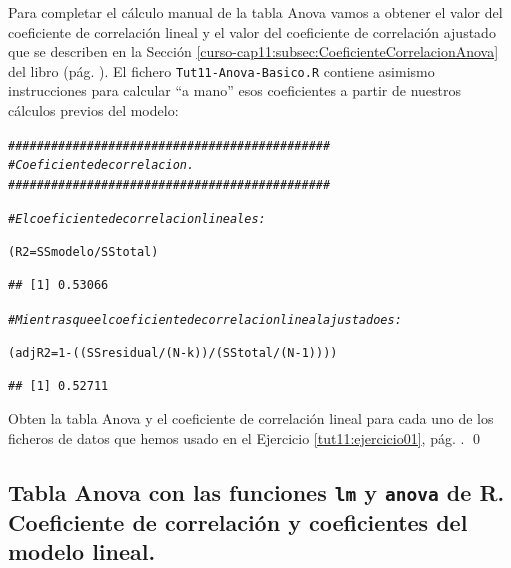 \documentclass[10pt,a4paper]{article}\usepackage[]{graphicx}\usepackage[]{color}
\makeatletter
\newcommand{\hlnum}[1]{\textcolor[rgb]{0.686,0.059,0.569}{#1}}%
\newcommand{\hlcom}[1]{\textcolor[rgb]{0.678,0.584,0.686}{\textit{#1}}}%
\newcommand{\hlopt}[1]{\textcolor[rgb]{0,0,0}{#1}}%
\newcommand{\hlstd}[1]{\textcolor[rgb]{0.345,0.345,0.345}{#1}}%
\newcommand{\hlkwb}[1]{\textcolor[rgb]{0.69,0.353,0.396}{#1}}%
\newenvironment{kframe}{%
 \def\at@end@of@kframe{}%
 \ifinner\ifhmode%
  \def\at@end@of@kframe{\end{minipage}}%
  \begin{minipage}{\columnwidth}%
 \fi\fi%
 \def\FrameCommand##1{\hskip\@totalleftmargin \hskip-\fboxsep
 \colorbox{shadecolor}{##1}\hskip-\fboxsep
     \hskip-\linewidth \hskip-\@totalleftmargin \hskip\columnwidth}%
 \MakeFramed {\advance\hsize-\width
   \@totalleftmargin\z@ \linewidth\hsize
   \@setminipage}}%
 {\par\unskip\endMakeFramed%
 \at@end@of@kframe}
\newenvironment{knitrout}{}{} %
\newcounter {cont01}
\makeatother
\begin{document}
Para completar el cálculo manual de la tabla Anova vamos a obtener el valor del coeficiente de correlación lineal y el valor del coeficiente de correlación ajustado que se describen en la Sección \ref{curso-cap11:subsec:CoeficienteCorrelacionAnova} del libro (pág. \pageref{curso-cap11:subsec:CoeficienteCorrelacionAnova}). El fichero {\tt Tut11-Anova-Basico.R} contiene asimismo instrucciones para calcular ``a mano'' esos coeficientes a partir de nuestros cálculos previos del modelo:
\begin{knitrout}
\color{fgcolor}\begin{kframe}
\begin{alltt}
\hlcom{#############################################}
\hlcom{# Coeficiente de correlacion.}
\hlcom{#############################################}

\hlcom{# El coeficiente de correlacion lineal es:}

\hlstd{(R2} \hlkwb{=} \hlstd{SSmodelo} \hlopt{/} \hlstd{SStotal)}
\end{alltt}
\begin{verbatim}
## [1] 0.53066
\end{verbatim}
\begin{alltt}
\hlcom{# Mientras que el coeficiente de correlacion lineal ajustado es:}

\hlstd{(adjR2} \hlkwb{=} \hlnum{1} \hlopt{-} \hlstd{((SSresidual} \hlopt{/} \hlstd{(N} \hlopt{-} \hlstd{k))} \hlopt{/} \hlstd{(SStotal} \hlopt{/} \hlstd{(N} \hlopt{-} \hlnum{1}\hlstd{))))}
\end{alltt}
\begin{verbatim}
## [1] 0.52711
\end{verbatim}
\end{kframe}
\end{knitrout}

\begin{ejercicio}
\label{tut11:ejercicio03}
Obten la tabla Anova y el coeficiente de correlación lineal para cada uno de los ficheros de datos que hemos usado en el Ejercicio \ref{tut11:ejercicio01}, pág. \pageref{tut11:ejercicio01}. %
\qed
\end{ejercicio}


\subsection{Tabla Anova con las funciones {\tt lm} y {\tt anova} de R. Coeficiente de correlación y coeficientes del modelo lineal.}
\label{tut11:subsec:TablaAnovaConFuncionAnovaR}
\end{document}
